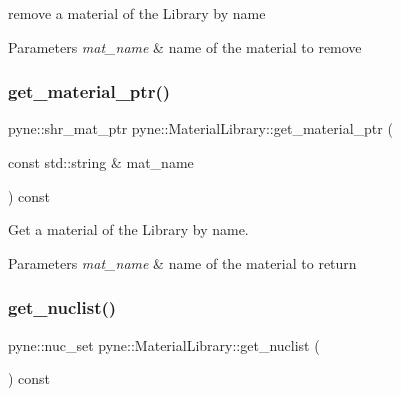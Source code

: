 remove a material of the Library by name 


\begin{DoxyParams}{Parameters}
{\em mat\+\_\+name} & name of the material to remove \\
\hline
\end{DoxyParams}
\mbox{\label{classpyne_1_1_material_library_a4d14394a369b4cecb07a5e875f7713d1}} 
\subsubsection{\texorpdfstring{get\+\_\+material\+\_\+ptr()}{get\_material\_ptr()}}
{\footnotesize\ttfamily pyne\+::shr\+\_\+mat\+\_\+ptr pyne\+::\+Material\+Library\+::get\+\_\+material\+\_\+ptr (\begin{DoxyParamCaption}\item[{const std\+::string \&}]{mat\+\_\+name }\end{DoxyParamCaption}) const}



Get a material of the Library by name. 


\begin{DoxyParams}{Parameters}
{\em mat\+\_\+name} & name of the material to return \\
\hline
\end{DoxyParams}
\mbox{\label{classpyne_1_1_material_library_a1f4d1bc89f50f73e2397119e5cafa5f5}} 
\subsubsection{\texorpdfstring{get\+\_\+nuclist()}{get\_nuclist()}}
{\footnotesize\ttfamily pyne\+::nuc\+\_\+set pyne\+::\+Material\+Library\+::get\+\_\+nuclist (\begin{DoxyParamCaption}{ }\end{DoxyParamCaption}) const\hspace{0.3cm}{\ttfamily [inline]}}



